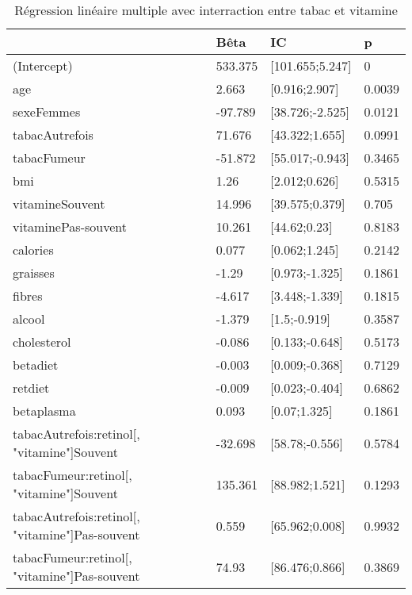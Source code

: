 \documentclass[]{article}
\begin{document}
\begin{table}

\caption{\label{tab:unnamed-chunk-71}Régression linéaire multiple avec interraction entre tabac et vitamine}
\centering
\begin{tabular}[t]{l|l|l|l}
\hline
  & Bêta & IC & p\\
\hline
\rowcolor[HTML]{BBD2E1}  (Intercept) & 533.375 & [101.655;5.247] & 0\\
\hline
age & 2.663 & [0.916;2.907] & 0.0039\\
\hline
\rowcolor[HTML]{BBD2E1}  sexeFemmes & -97.789 & [38.726;-2.525] & 0.0121\\
\hline
tabacAutrefois & 71.676 & [43.322;1.655] & 0.0991\\
\hline
\rowcolor[HTML]{BBD2E1}  tabacFumeur & -51.872 & [55.017;-0.943] & 0.3465\\
\hline
bmi & 1.26 & [2.012;0.626] & 0.5315\\
\hline
\rowcolor[HTML]{BBD2E1}  vitamineSouvent & 14.996 & [39.575;0.379] & 0.705\\
\hline
vitaminePas-souvent & 10.261 & [44.62;0.23] & 0.8183\\
\hline
\rowcolor[HTML]{BBD2E1}  calories & 0.077 & [0.062;1.245] & 0.2142\\
\hline
graisses & -1.29 & [0.973;-1.325] & 0.1861\\
\hline
\rowcolor[HTML]{BBD2E1}  fibres & -4.617 & [3.448;-1.339] & 0.1815\\
\hline
alcool & -1.379 & [1.5;-0.919] & 0.3587\\
\hline
\rowcolor[HTML]{BBD2E1}  cholesterol & -0.086 & [0.133;-0.648] & 0.5173\\
\hline
betadiet & -0.003 & [0.009;-0.368] & 0.7129\\
\hline
\rowcolor[HTML]{BBD2E1}  retdiet & -0.009 & [0.023;-0.404] & 0.6862\\
\hline
betaplasma & 0.093 & [0.07;1.325] & 0.1861\\
\hline
\rowcolor[HTML]{BBD2E1}  tabacAutrefois:retinol[, "vitamine"]Souvent & -32.698 & [58.78;-0.556] & 0.5784\\
\hline
tabacFumeur:retinol[, "vitamine"]Souvent & 135.361 & [88.982;1.521] & 0.1293\\
\hline
\rowcolor[HTML]{BBD2E1}  tabacAutrefois:retinol[, "vitamine"]Pas-souvent & 0.559 & [65.962;0.008] & 0.9932\\
\hline
tabacFumeur:retinol[, "vitamine"]Pas-souvent & 74.93 & [86.476;0.866] & 0.3869\\
\hline
\end{tabular}
\end{table}
\end{document}
